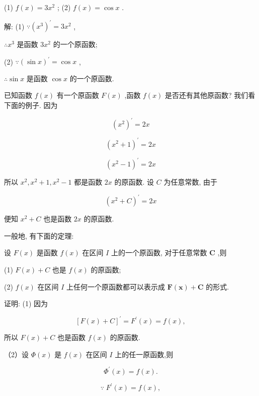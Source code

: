 \documentclass[lang=cn,newtx,12pt,scheme=chinese]{elegantbook}
\begin{document}
(1) \(f\left( x\right) = 3{x}^{2}\) ; (2) \(f\left( x\right) = \cos x\) .

解: (1) \(\because {\left( {x}^{3}\right) }^{\prime } = 3{x}^{2}\) ,

\(\therefore {x}^{3}\) 是函数 \(3{x}^{2}\) 的一个原函数;

(2) \(\because {\left( \sin x\right) }^{\prime } = \cos x\) ,

\(\therefore \sin x\) 是函数 \(\cos x\) 的一个原函数.

已知函数 \(f\left( x\right)\) 有一个原函数 \(F\left( x\right)\) ,函数 \(f\left( x\right)\) 是否还有其他原函数? 我们看下面的例子. 因为

\[
{\left( {x}^{2}\right) }^{\prime } = {2x}
\]

\[
{\left( {x}^{2} + 1\right) }^{\prime } = {2x}
\]

\[
{\left( {x}^{2} - 1\right) }^{\prime } = {2x}
\]

所以 \({x}^{2},{x}^{2} + 1,{x}^{2} - 1\) 都是函数 \({2x}\) 的原函数. 设 \(C\) 为任意常数, 由于

\[
{\left( {x}^{2} + C\right) }^{\prime } = {2x}
\]

便知 \({x}^{2} + C\) 也是函数 \({2x}\) 的原函数.

一般地, 有下面的定理:

\begin{theorem}[定理]

设 \(F\left( x\right)\) 是函数 \(f\left( x\right)\) 在区间 \(I\) 上的一个原函数, 对于任意常数 \(\mathbf{C}\) ,则

(1) \(F\left( x\right) + C\) 也是 \(f\left( x\right)\) 的原函数;

(2) \(f\left( x\right)\) 在区间 \(I\) 上任何一个原函数都可以表示成 \(\mathbf{F}\left( \mathbf{x}\right) + \mathbf{C}\) 的形式.

\end{theorem}

证明: (1) 因为

\[
{\left\lbrack F\left( x\right) + C\right\rbrack }^{\prime } = {F}^{\prime }\left( x\right) = f\left( x\right) ,
\]

所以 \(F\left( x\right) + C\) 也是函数 \(f\left( x\right)\) 的原函数.

（2）设 \(\Phi \left( x\right)\) 是 \(f\left( x\right)\) 在区间 \(I\) 上的任一原函数,则

\[
{\Phi }^{\prime }\left( x\right) = f\left( x\right) .
\]

\[
\because \;{F}^{\prime }\left( x\right) = f\left( x\right) ,
\]
\end{document}
